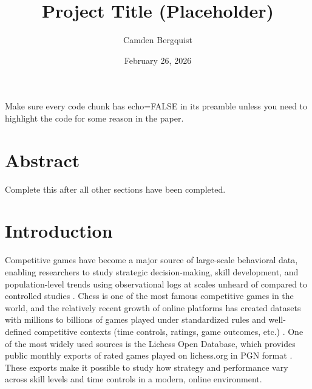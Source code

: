 \documentclass[
  12pt]{article}
\renewcommand*\contentsname{Table of contents}
\newcommand\contentsname{Table of contents}
\begin{document}
\def\spacingset#1{\renewcommand{\baselinestretch}%
{#1}\small\normalsize} \spacingset{1}



\date{February 26, 2026}
\title{\bf Project Title (Placeholder)}
\author{
Camden Bergquist\\
}
\maketitle

\bigskip
\bigskip
\begin{abstract}

\end{abstract}


\newpage
\spacingset{1.9} %

\renewcommand*\contentsname{Table of contents}
{
\hypersetup{linkcolor=}
\setcounter{tocdepth}{3}
\tableofcontents
}
\listoffigures
\listoftables

Make sure every code chunk has echo=FALSE in its preamble unless you
need to highlight the code for some reason in the paper.

\section{Abstract}\label{abstract}

Complete this after all other sections have been completed.

\newpage

\section{Introduction}\label{introduction}

Competitive games have become a major source of large-scale behavioral
data, enabling researchers to study strategic decision-making, skill
development, and population-level trends using observational logs at
scales unheard of compared to controlled studies
\citep{edelmann2020css, watts2014css}. Chess is one of the most famous
competitive games in the world, and the relatively recent growth of
online platforms has created datasets with millions to billions of games
played under standardized rules and well-defined competitive contexts
(time controls, ratings, game outcomes, etc.)
\citep{watts2014css, lichessDatabase}. One of the most widely used
sources is the Lichess Open Database, which provides public monthly
exports of rated games played on lichess.org in PGN format
\citep{lichessDatabase, lichessDatabaseGitHub}. These exports make it
possible to study how strategy and performance vary across skill levels
and time controls in a modern, online environment.
\end{document}
